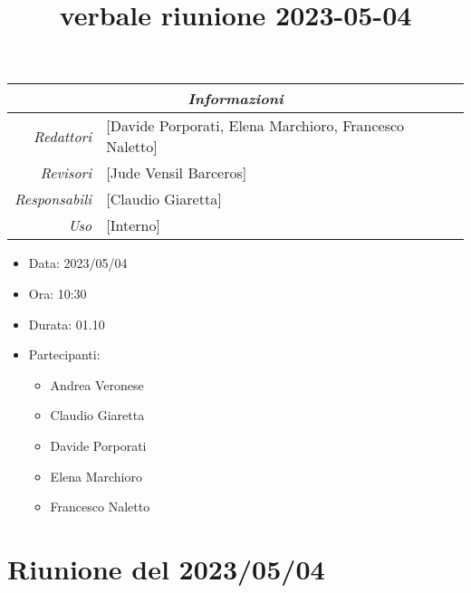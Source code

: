 \documentclass[12pt]{article}
\begin{document}
\graphicspath{ {../../templates/img} }

\title{verbale riunione 2023-05-04}

\firstPage
\maketitle

\begin{center}
\begin{tabular}{r | l}
    \multicolumn{2}{c}{\textit{Informazioni}}\\
    \hline
    
        \textit{Redattori} &
        [Davide Porporati, Elena Marchioro, Francesco Naletto]\makecell{}\\
    
        \textit{Revisori} &
        [Jude Vensil Barceros]\makecell{}\\
        \textit{Responsabili} &
        [Claudio Giaretta]\makecell{}\\
            \textit{Uso} & 
            [Interno]\makecell{}\\
\end{tabular}
    \begin{itemize}
    \item[] Data: 2023/05/04
    \item[] Ora: 10:30
    \item[] Durata: 01.10
    \item[] Partecipanti:
    \begin{itemize}
    \item[] Andrea Veronese
    \item[] Claudio Giaretta
    \item[] Davide Porporati
    \item[] Elena Marchioro
    \item[] Francesco Naletto
    \end{itemize}
    \end{itemize}
\end{center}


\tableofcontents
\printindex 
\section{Riunione del 2023/05/04}
\end{document}
